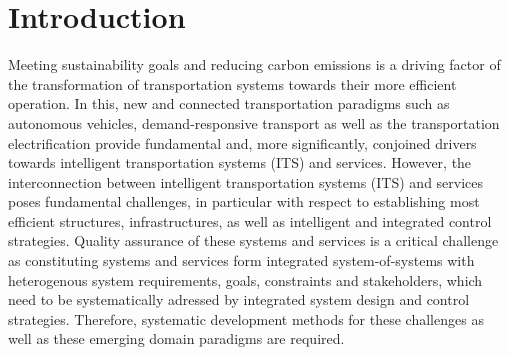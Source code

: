 \documentclass[graybox]{svmult}
\begin{document}
\vspace{-2mm}
  \section{Introduction}
\label{sec:intro}
Meeting sustainability goals and reducing carbon emissions \cite{sachs2019six} is a driving factor of the transformation of transportation systems towards their more efficient operation. In this, new and connected transportation paradigms such as autonomous vehicles, demand-responsive transport \cite{brake_demand_2004} as well as the transportation electrification \cite{pereirinha2018main} provide fundamental and, more significantly, conjoined drivers towards intelligent transportation systems (ITS) and services.
However, the interconnection between intelligent transportation systems (ITS) and services poses fundamental challenges, in particular with respect to establishing most efficient structures, infrastructures, as well as intelligent and integrated control strategies. Quality assurance of these systems and services is a critical challenge as constituting systems and services form integrated system-of-systems with heterogenous system requirements, goals, constraints and stakeholders, which need to be systematically adressed by integrated system design and control strategies. Therefore, systematic development methods for these challenges as well as these emerging domain paradigms are required.

\vspace{-2mm}
\end{document}
